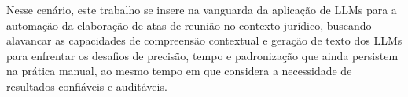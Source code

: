 Nesse cenário, este trabalho se insere na vanguarda da aplicação de LLMs para a automação da elaboração de atas de reunião no contexto jurídico, buscando alavancar as capacidades de compreensão contextual e geração de texto dos LLMs para enfrentar os desafios de precisão, tempo e padronização que ainda persistem na prática manual, ao mesmo tempo em que considera a necessidade de resultados confiáveis e auditáveis.